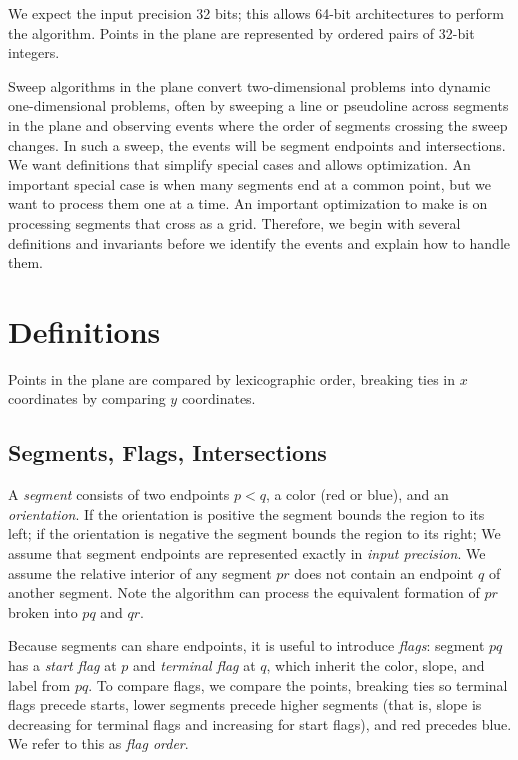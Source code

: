 \documentclass[11pt]{article}
\begin{document}
We expect the input precision 32 bits; this allows 64-bit architectures to perform the algorithm.
Points in the plane are represented by ordered pairs of 32-bit integers.

Sweep algorithms in the plane convert two-dimensional problems into dynamic one-dimensional problems,
often by sweeping a line or pseudoline across segments in the
plane and observing events where the order of segments crossing the sweep changes.
In such a sweep,  the events will be segment endpoints and intersections. 
We want definitions that simplify special cases and allows optimization.
An important special case is when many segments end at a common point, but we want to process them one at a time.
An important optimization to make is on processing segments that cross as a grid.  
Therefore, we begin with several definitions and invariants before we identify the events and explain how to handle them. 

\section{Definitions}
Points in the plane are compared by lexicographic order, breaking ties in $x$ coordinates by comparing $y$ coordinates.

\subsection{Segments, Flags, Intersections}
A \textit{segment} consists of two endpoints $p<q$, a color (red or blue), and
an \textit{orientation}.
If the orientation is positive the segment bounds the region to its left; if the orientation is negative the segment bounds the region to its right;
We assume that segment endpoints are represented exactly in {\it input precision}.
We assume the relative interior of any segment $pr$ does not contain an endpoint $q$ of another segment.
Note the algorithm can process the equivalent formation of $pr$ broken into $pq$ and $qr$.

Because segments can share endpoints, it is useful to introduce \textit{flags}: segment $pq$ has a \textit{start flag} at $p$ and \textit{terminal flag} at $q$, which inherit the color, slope, and label from $pq$. 
To compare flags, we compare the points, breaking ties so terminal flags precede starts, lower segments precede higher segments (that is, slope is decreasing for terminal flags and increasing for start flags), and red precedes blue.
We refer to this as \textit{flag order}.
\end{document}

